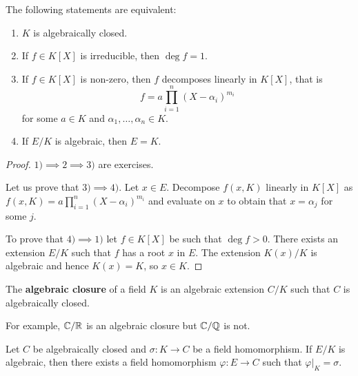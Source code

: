 \begin{proposition}
	The following statements are equivalent:
	\begin{enumerate}
		\item $K$ is algebraically closed.
		\item If $f\in K[X]$ is irreducible, then $\deg f=1$.
		\item If $f\in K[X]$ is non-zero, then $f$ decomposes linearly in $K[X]$, that is
			\[
				f=a\prod_{i=1}^n(X-\alpha_i)^{m_i}
			\]
			for some $a\in K$ and $\alpha_1,\dots,\alpha_n\in K$. 
		\item If $E/K$ is algebraic, then $E=K$. 
	\end{enumerate}
\end{proposition}

\begin{proof}
	$1)\implies 2\implies 3)$ are exercises.  
	
	Let us prove that $3)\implies
	4)$. Let $x\in E$. Decompose $f(x,K)$ linearly in $K[X]$ as
	$f(x,K)=a\prod_{i=1}^n(X-\alpha_i)^{m_i}$ and evaluate on $x$ to obtain that
	$x=\alpha_j$ for some $j$. 
	
	To prove that $4)\implies 1)$ let $f\in K[X]$ be
	such that $\deg f>0$. There exists an extension $E/K$ such that $f$ has a
	root $x$ in $E$. The extension $K(x)/K$ is algebraic and hence $K(x)=K$, so
	$x\in K$. 
\end{proof}




\begin{definition}
	The \textbf{algebraic closure} of a field $K$ is an algebraic extension $C/K$ 
	such that $C$ is algebraically closed. 
\end{definition}

For example, $\mathbb{C}/\mathbb{R}$ is an algebraic closure but $\mathbb{C}/\mathbb{Q}$ is not. 

\begin{proposition}
\label{pro:Artin}
	Let $C$ be algebraically closed and $\sigma\colon K\to C$ be a field homomorphism. If $E/K$ 
	is algebraic, then there exists a field homomorphism 
	$\varphi\colon E\to C$ such that 
	$\varphi|_K=\sigma$. 
\end{proposition}

